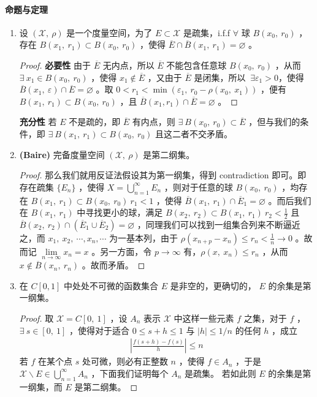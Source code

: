 \paragraph{命题与定理}
\begin{enumerate}[leftmargin=2cm, label=\arabic*]
    \item 设 $(\mathscr{X},\ \rho)$ 是一个度量空间，为了 $E\subset\mathscr{X}$ 是疏集，i.f.f $\forall$ 球 $B(x_0,\ r_0)$ ，存在 $B(x_1,\ r_1)\subset B(x_0,\ r_0)$ ，使得 $\overline{E}\cap\overline{B}(x_1,\ r_1) = \varnothing$ 。
\begin{proof}
    \textbf{必要性} 由于 $\overline{E}$ 无内点，所以 $\overline{E}$ 不能包含任意球 $B(x_0,\ r_0)$ ，从而 $\exists\ x_1\in B(x_0,\ r_0)$ ，使得 $x_1\notin \overline{E}$ ，又由于 $\overline{E}$ 是闭集，所以 $\ \exists \varepsilon_1 >0$，使得 $\overline{B}(x_1,\ \varepsilon)\cap \overline{E} = \varnothing$ 。取 $0 < r_1 < \min(\varepsilon_1,\ r_0 - \rho(x_0,\ x_1))$ ，便有 $B(x_1,\ r_1)\subset B(x_0,\ r_0)$ ，且 $\overline{B}(x_1, r_1)\cap\overline{E} = \varnothing$ 。
\end{proof}
    \textbf{充分性} 若 $E$ 不是疏的，即 $\overline{E}$ 有内点，则 $\exists\ B(x_0,\ r_0)\subset \overline{E}$ ，但与我们的条件，即 $\exists\ B(x_1,\ r_1)\subset B(x_0,\ r_0)$ 且这二者不交矛盾。 
    \item \textbf{(Baire)} 完备度量空间 $(\mathscr{X},\ \rho)$ 是第二纲集。
\begin{proof}
    那么我们就用反证法假设其为第一纲集，得到 contradiction 即可。即存在疏集 $\{E_n\}$ ，使得 $X = \bigcup\limits_{n=1}^{\infty} E_n$ ，则对于任意的球 $B(x_0,\ r_0)$ ，均存在 $B(x_1,\ r_1)\subset B(x_0,\ r_0)\ r_1<1$ ，使得 $\overline{B}(x_1,\ r_1)\cap \overline{E}_1 = \varnothing$ 。而后我们在 $B(x_1,\ r_1)$ 中寻找更小的球，满足 $B(x_2,\ r_2)\subset B(x_1,\ r_1)\ r_2<\frac{1}{2}$ 且 $\overline{B}(x_2,\ r_2)\cap \left(\overline{E}_1\cup \overline{E}_2\right) = \varnothing$ ，同理我们可以找到一组集合列来不断逼近之，而 $x_1,\ x_2,\ \cdots, x_n, \cdots$ 为一基本列，由于 $\rho(x_{n+p}-x_n) \leqslant r_n < \frac{1}{n}\to 0$ 。故而记 $\lim\limits_{n\to\infty} x_n = x$ 。另一方面，令 $p\to \infty$ 有，$\rho(x,\ x_n)\leqslant r_n$ ，从而 $x\notin \overline{B}(x_n,\ r_n)$ 。故而矛盾。
\end{proof}
    \item 在 $C[0,1]$ 中处处不可微的函数集合 $E$ 是非空的，更确切的， $E$ 的余集是第一纲集。
\begin{proof}
    取 $\mathscr{X}=C[0,\ 1]$ ，设 $A_n$ 表示 $\mathscr{X}$ 中这样一些元素 $f$ 之集，对于 $f$ ，$\exists\ s\in [0,\ 1]$ ，使得对于适合 $0\leqslant s+h\leqslant 1$ 与 $|h|\leqslant 1/n$ 的任何 $h$ ，成立
\begin{align*}
    \left|\frac{f(s+h) - f(s)}{h} \right| \leqslant n
\end{align*}
若 $f$ 在某个点 $s$ 处可微，则必有正整数 $n$ ，使得 $f\in A_n$ ，于是 $\mathscr{X}\backslash E\in \bigcup\limits_{n=1}^{\infty} A_n$ ，下面我们证明每个 $A_n$ 是疏集。 若如此则 $E$ 的余集是第一纲集，而 $E$ 是第二纲集。 
    

\end{proof}
\end{enumerate}

